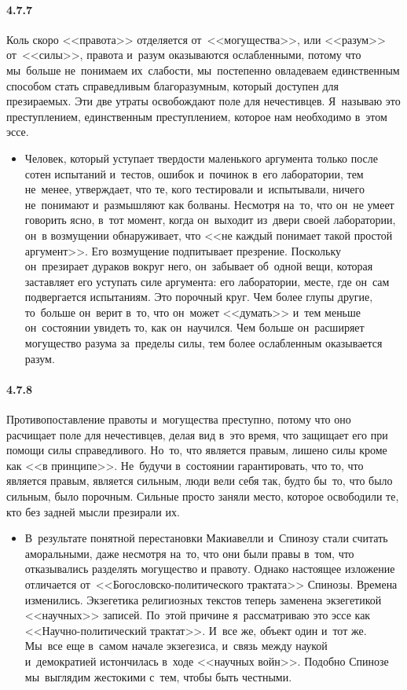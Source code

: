 \paragraph{4.7.7}\hypertarget{par:4.7.7}{} Коль скоро <<правота>> отделяется от~<<могущества>>, или <<разум>> от~<<силы>>, правота и~разум оказываются ослабленными, потому что мы~больше не~понимаем их~слабости, мы~постепенно овладеваем единственным способом стать справедливым благоразумным, который доступен для презираемых. Эти две утраты освобождают поле для нечестивцев. Я~называю это преступлением, единственным преступлением, которое нам необходимо в~этом эссе.
	\begin{itemize}
	\item 
	Человек, который уступает твердости маленького аргумента только после сотен испытаний и~тестов, ошибок и~починок в~его лаборатории, тем не~менее, утверждает, что те, кого тестировали и~испытывали, ничего не~понимают и~размышляют как болваны. Несмотря на~то, что он~не умеет говорить ясно, в~тот момент, когда он~выходит из~двери своей лаборатории, он~в возмущении обнаруживает, что <<не каждый понимает такой простой аргумент>>. Его возмущение подпитывает презрение. Поскольку он~презирает дураков вокруг него, он~забывает об~одной вещи, которая заставляет его уступать силе аргумента: его лаборатории, месте, где он~сам подвергается испытаниям. Это порочный круг. Чем более глупы другие, то~больше он~верит в~то, что он~может <<думать>> и~тем меньше он~состоянии увидеть то, как он~научился. Чем больше он~расширяет могущество разума за~пределы силы, тем более ослабленным оказывается разум.
	\end{itemize}


\paragraph{4.7.8}\hypertarget{par:4.7.8}{} Противопоставление правоты и~могущества преступно, потому что оно расчищает поле для нечестивцев, делая вид в~это время, что защищает его при помощи силы справедливого. Но~то, что является правым, лишено силы кроме как <<в принципе>>. Не~будучи в~состоянии гарантировать, что то, что является правым, является сильным, люди вели себя так, будто бы~то, что было сильным, было порочным. Сильные просто заняли место, которое освободили те, кто без задней мысли презирали их.
	\begin{itemize}
	\item 
 В~результате понятной перестановки Макиавелли и~Спинозу стали считать аморальными, даже несмотря на~то, что они были правы в~том, что отказывались разделять могущество и правоту. Однако настоящее изложение отличается от~<<Богословско-политического трактата>> Спинозы. Времена изменились. Экзегетика религиозных текстов теперь заменена экзегетикой <<научных>> записей. По~этой причине я~рассматриваю это эссе как <<Научно-политический трактат>>. И~все же, объект один и~тот же. Мы~все еще в~самом начале экзегезиса, и~связь между наукой и~демократией истончилась в~ходе <<научных войн>>. Подобно Спинозе мы~выглядим жестокими с~тем, чтобы быть честными.
	\end{itemize}	

